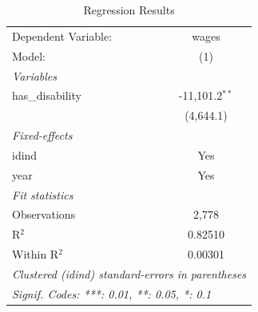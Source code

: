  
\begin{table}[htbp]
   \caption{\label{tab:results} Regression Results}
   \centering
   \begin{tabular}{lc}
      \tabularnewline \midrule \midrule
      Dependent Variable: & wages\\  
      Model:              & (1)\\  
      \midrule
      \emph{Variables}\\
      has\_disability     & -11,101.2$^{**}$\\   
                          & (4,644.1)\\   
      \midrule
      \emph{Fixed-effects}\\
      idind               & Yes\\  
      year                & Yes\\  
      \midrule
      \emph{Fit statistics}\\
      Observations        & 2,778\\  
      R$^2$               & 0.82510\\  
      Within R$^2$        & 0.00301\\  
      \midrule \midrule
      \multicolumn{2}{l}{\emph{Clustered (idind) standard-errors in parentheses}}\\
      \multicolumn{2}{l}{\emph{Signif. Codes: ***: 0.01, **: 0.05, *: 0.1}}\\
   \end{tabular}
\end{table}
 
